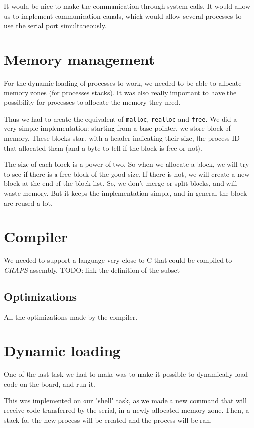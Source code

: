 \documentclass[openany, a4paper]{book}
\begin{document}
        It would be nice to make the communication through system calls. It
        would allow us to implement communication canals, which would allow
        several processes to use the serial port simultaneously.

    \section{Memory management}
      For the dynamic loading of processes to work, we needed to be able to
      allocate memory zones (for processes stacks). It was also really important
      to have the possibility for processes to allocate the memory they need.

      Thus we had to create the equivalent of \verb+malloc+, \verb+realloc+ and
      \verb+free+. We did a very
      simple implementation: starting from a base pointer, we store block of
      memory. These blocks start with a header indicating their size, the
      process ID that allocated them (and a byte to tell if the block is free or
      not).

      The size of each block is a power of two. So when we allocate a block, we
      will try to see if there is a free block of the good size. If there is
      not, we will create a new block at the end of the block list.
      So, we don't merge or split blocks, and will waste memory. But it keeps
      the implementation simple, and in general the block are reused a lot.

    \section{Compiler}
      We needed to support a language very close to C that could be compiled to
      \emph{CRAPS} assembly.
      TODO: link the definition of the subset

      \subsection{Optimizations}
        All the optimizations made by the compiler.

    \section{Dynamic loading}
      One of the last task we had to make was to make it possible to
      dynamically load code on the board, and run it.

      This was implemented on our "shell" task, as we made a new command that
      will receive code transferred by the serial, in a newly allocated
      memory zone.  Then, a stack for the new process will be created and the
      process will be ran.
\end{document}
